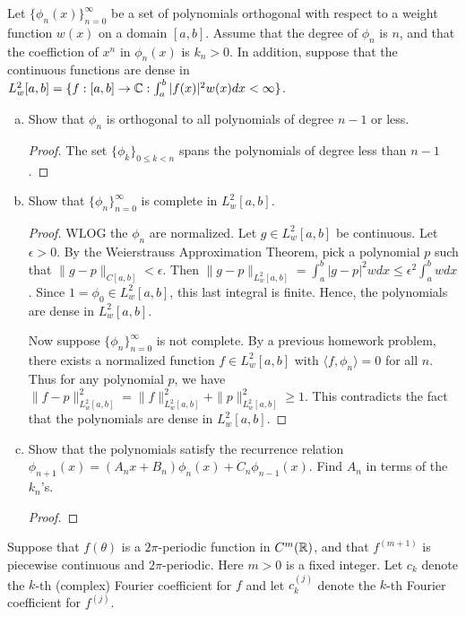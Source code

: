 \documentclass{article}
\begin{document}
  
  Let $\{\phi_n(x)\}_{n=0}^\infty$ be a set of polynomials orthogonal with respect to a weight function $w(x)$ on a domain $[a,b]$. Assume that the degree of $\phi_n$ is $n$, and that the coeffiction of $x^n$ in $\phi_n(x)$ is $k_n > 0$. In addition, suppose that the continuous functions are dense in $L_w^2[a,b] = \{f : [a,b] \to \mathbb{C} : \int_a^b |f(x)|^2 w(x) dx < \infty \}$.

\begin{enumerate}[(a)]
\item Show that $\phi_n$ is orthogonal to all polynomials of degree $n - 1$ or less.
\begin{proof}
The set $\{\phi_k\}_{0 \le k < n}$ spans the polynomials of degree less than $n-1$.
\end{proof}
\item Show that $\{ \phi_n \}_{n=0}^\infty$ is complete in $L_w^2[a,b]$.
\begin{proof}
WLOG the $\phi_n$ are normalized.  Let $g \in L_w^2[a,b]$ be continuous.  Let $\epsilon > 0$.  By the Weierstrauss Approximation Theorem, pick a polynomial $p$ such that $\|g - p \|_{C[a,b]} < \epsilon$.  Then
$\|g - p\|_{L_w^2[a,b]} = \int_a^b |g - p|^2 w dx \le \epsilon^2 \int_a^b w dx$.  Since $1 = \phi_0 \in L_w^2[a,b]$, this last integral is finite.  Hence, the polynomials are dense in $L_w^2[a,b]$.

Now suppose $\{ \phi_n \}_{n=0}^\infty$ is not complete. By a previous homework problem, there exists a normalized function $f \in L_w^2[a,b]$ with $\langle f, \phi_n \rangle = 0$ for all $n$.  Thus for any polynomial $p$, we have $\|f - p\|_{L_w^2[a,b]}^2 = \|f\|_{L_w^2[a,b]}^2 + \|p\|_{L_w^2[a,b]}^2 \ge 1$.  This contradicts the fact that the polynomials are dense in ${L_w^2[a,b]}$.

\end{proof}
\item Show that the polynomials satisfy the recurrence relation $\phi_{n+1}(x) = (A_nx + B_n) \phi_n(x) + C_n \phi_{n-1}(x)$. Find $A_n$ in terms of the $k_n$'s.  
\begin{proof}

\end{proof}
\end{enumerate}


 Suppose that $f(\theta)$ is a $2 \pi$-periodic function in $C^m( \mathbb{R})$, and that $f^{(m+1)}$ is piecewise continuous and $2 \pi$-periodic. Here $m > 0$ is a fixed integer.  Let $c_k$ denote the $k$-th (complex) Fourier coefficient for $f$ and let $c_k^{(j)}$ denote the $k$-th Fourier coefficient for $f^{(j)}$.
\end{document}
